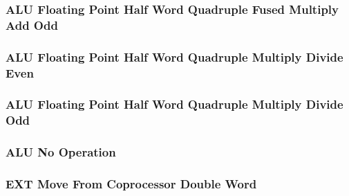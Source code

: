 

\subsubsection[{\small ALU Floating Point Half Word Quadruple Fused Multiply Add Odd}]{ALU Floating Point Half Word Quadruple Fused Multiply Add Odd} \label{sec:format-ALU-FHQFMAO}



\subsubsection[{\small ALU Floating Point Half Word Quadruple Multiply Divide Even}]{ALU Floating Point Half Word Quadruple Multiply Divide Even} \label{sec:format-ALU-FHQMULE}



\subsubsection[{\small ALU Floating Point Half Word Quadruple Multiply Divide Odd}]{ALU Floating Point Half Word Quadruple Multiply Divide Odd} \label{sec:format-ALU-FHQMULO}



\subsubsection[{\small ALU No Operation}]{ALU No Operation} \label{sec:format-ALU-NOP}



\subsubsection[{\small EXT Move From Coprocessor Double Word}]{EXT Move From Coprocessor Double Word} \label{sec:format-EXT-XMOVEFD}

